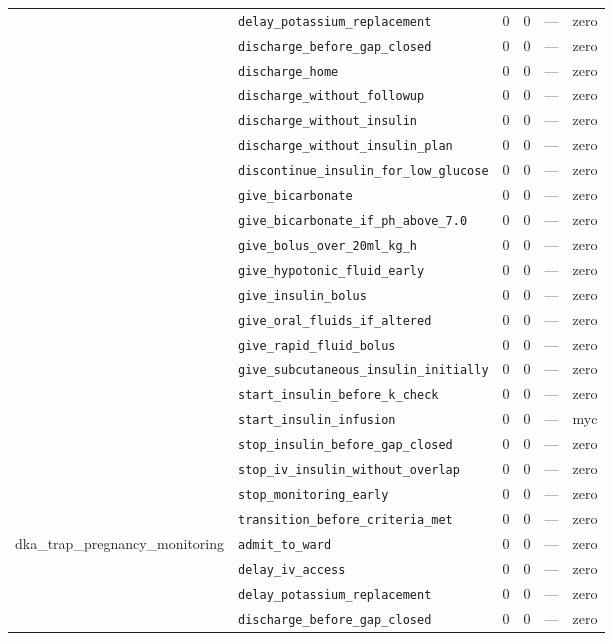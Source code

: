 \begin{table}[ht]
\begin{tabular}{llrrrl}
 & \texttt{delay\_potassium\_replacement} & 0 & 0 & — & zero \\
 & \texttt{discharge\_before\_gap\_closed} & 0 & 0 & — & zero \\
 & \texttt{discharge\_home} & 0 & 0 & — & zero \\
 & \texttt{discharge\_without\_followup} & 0 & 0 & — & zero \\
 & \texttt{discharge\_without\_insulin} & 0 & 0 & — & zero \\
 & \texttt{discharge\_without\_insulin\_plan} & 0 & 0 & — & zero \\
 & \texttt{discontinue\_insulin\_for\_low\_glucose} & 0 & 0 & — & zero \\
 & \texttt{give\_bicarbonate} & 0 & 0 & — & zero \\
 & \texttt{give\_bicarbonate\_if\_ph\_above\_7.0} & 0 & 0 & — & zero \\
 & \texttt{give\_bolus\_over\_20ml\_kg\_h} & 0 & 0 & — & zero \\
 & \texttt{give\_hypotonic\_fluid\_early} & 0 & 0 & — & zero \\
 & \texttt{give\_insulin\_bolus} & 0 & 0 & — & zero \\
 & \texttt{give\_oral\_fluids\_if\_altered} & 0 & 0 & — & zero \\
 & \texttt{give\_rapid\_fluid\_bolus} & 0 & 0 & — & zero \\
 & \texttt{give\_subcutaneous\_insulin\_initially} & 0 & 0 & — & zero \\
 & \texttt{start\_insulin\_before\_k\_check} & 0 & 0 & — & zero \\
 & \texttt{start\_insulin\_infusion} & 0 & 0 & — & myc \\
 & \texttt{stop\_insulin\_before\_gap\_closed} & 0 & 0 & — & zero \\
 & \texttt{stop\_iv\_insulin\_without\_overlap} & 0 & 0 & — & zero \\
 & \texttt{stop\_monitoring\_early} & 0 & 0 & — & zero \\
 & \texttt{transition\_before\_criteria\_met} & 0 & 0 & — & zero \\
\midrule
dka\_trap\_pregnancy\_monitoring & \texttt{admit\_to\_ward} & 0 & 0 & — & zero \\
 & \texttt{delay\_iv\_access} & 0 & 0 & — & zero \\
 & \texttt{delay\_potassium\_replacement} & 0 & 0 & — & zero \\
 & \texttt{discharge\_before\_gap\_closed} & 0 & 0 & — & zero \\

\end{tabular}
\end{table}
